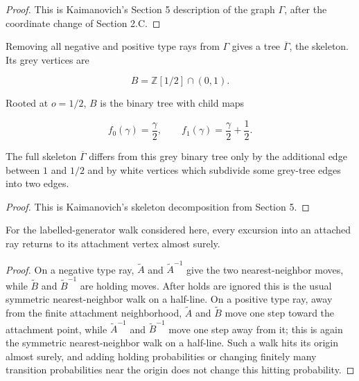 \documentclass[11pt,a4paper]{scrartcl}
\begin{document}
\begin{proof}
This is Kaimanovich's Section 5 description of the graph \(\Gamma\), after the
coordinate change of Section 2.C.
\end{proof}

\begin{proposition}\label{prop:skeleton-grey-tree}
Removing all negative and
positive type rays from \(\Gamma\) gives a tree \(\overline\Gamma\), the
skeleton. Its grey vertices are

\[
B=\mathbb Z[1/2]\cap(0,1).
\]

Rooted at \(o=1/2\), \(B\) is the binary tree with child maps

\[
f_0(\gamma)=\frac{\gamma}{2},
\qquad
f_1(\gamma)=\frac{\gamma}{2}+\frac12 .
\]

The full skeleton \(\overline\Gamma\) differs from this grey binary tree only
by the additional edge between \(1\) and \(1/2\) and by white vertices which
subdivide some grey-tree edges into two edges.

\end{proposition}

\begin{proof}
This is Kaimanovich's skeleton decomposition from Section 5.
\end{proof}

\begin{lemma}\label{lem:ray-excursions-recurrent}
For the labelled-generator walk
considered here, every excursion into an attached ray returns to its attachment
vertex almost surely.

\end{lemma}
\begin{proof}
On a negative type ray, \(\widetilde A\) and \(\widetilde A^{-1}\) give the
two nearest-neighbor moves, while \(\widetilde B\) and \(\widetilde B^{-1}\)
are holding moves. After holds are ignored this is the usual symmetric
nearest-neighbor walk on a half-line. On a positive type ray, away from the
finite attachment neighborhood, \(\widetilde A\) and \(\widetilde B\) move one
step toward the attachment point, while
\(\widetilde A^{-1}\) and \(\widetilde B^{-1}\) move one step away from it;
this is again the symmetric nearest-neighbor walk on a half-line. Such a walk
hits its origin almost surely, and adding holding probabilities or changing
finitely many transition probabilities near the origin does not change this
hitting probability.
\end{proof}
\end{document}
